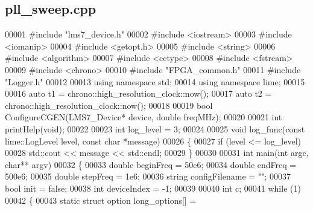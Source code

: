 \subsection{pll\+\_\+sweep.\+cpp}
\label{pll__sweep_8cpp_source}

\begin{DoxyCode}
00001 \textcolor{preprocessor}{#include "lms7_device.h"}
00002 \textcolor{preprocessor}{#include <iostream>}
00003 \textcolor{preprocessor}{#include <iomanip>}
00004 \textcolor{preprocessor}{#include <getopt.h>}
00005 \textcolor{preprocessor}{#include <string>}
00006 \textcolor{preprocessor}{#include <algorithm>}
00007 \textcolor{preprocessor}{#include <cctype>}
00008 \textcolor{preprocessor}{#include <fstream>}
00009 \textcolor{preprocessor}{#include <chrono>}
00010 \textcolor{preprocessor}{#include "FPGA_common.h"}
00011 \textcolor{preprocessor}{#include "Logger.h"}
00012 
00013 \textcolor{keyword}{using namespace }std;
00014 \textcolor{keyword}{using namespace }lime;
00015 
00016 \textcolor{keyword}{auto} t1 = chrono::high\_resolution\_clock::now();
00017 \textcolor{keyword}{auto} t2 = chrono::high\_resolution\_clock::now();
00018 
00019 \textcolor{keywordtype}{bool} ConfigureCGEN(LMS7_Device* device, \textcolor{keywordtype}{double} freqMHz);
00020 
00021 \textcolor{keywordtype}{int} printHelp(\textcolor{keywordtype}{void});
00022 
00023 \textcolor{keywordtype}{int} log_level = 3;
00024 
00025 \textcolor{keywordtype}{void} log_func(\textcolor{keyword}{const} lime::LogLevel level, \textcolor{keyword}{const} \textcolor{keywordtype}{char} *message)
00026 \{
00027     \textcolor{keywordflow}{if} (level <= log_level)
00028         std::cout << message << std::endl;
00029 \}
00030 
00031 \textcolor{keywordtype}{int} main(\textcolor{keywordtype}{int} argc, \textcolor{keywordtype}{char}** argv)
00032 \{
00033     \textcolor{keywordtype}{double} beginFreq = 50e6;
00034     \textcolor{keywordtype}{double} endFreq = 500e6;
00035     \textcolor{keywordtype}{double} stepFreq = 1e6;
00036     \textcolor{keywordtype}{string} configFilename = \textcolor{stringliteral}{""};
00037     \textcolor{keywordtype}{bool} init = \textcolor{keyword}{false};
00038     \textcolor{keywordtype}{int} deviceIndex = -1;
00039 
00040     \textcolor{keywordtype}{int} c;
00041     \textcolor{keywordflow}{while} (1)
00042     \{
00043         \textcolor{keyword}{static} \textcolor{keyword}{struct }option long\_options[] =

\end{DoxyCode}
